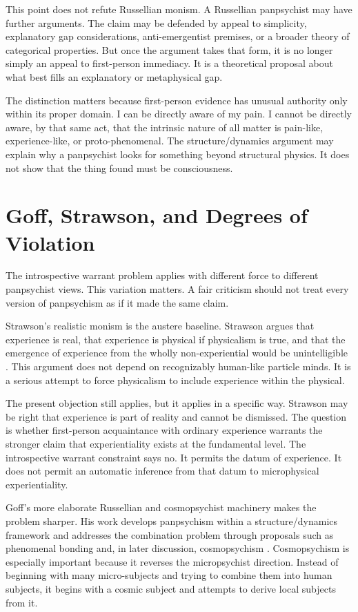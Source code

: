 \documentclass[12pt]{article}
\begin{document}
This point does not refute Russellian monism. A Russellian panpsychist may have further arguments. The claim may be defended by appeal to simplicity, explanatory gap considerations, anti-emergentist premises, or a broader theory of categorical properties. But once the argument takes that form, it is no longer simply an appeal to first-person immediacy. It is a theoretical proposal about what best fills an explanatory or metaphysical gap.

The distinction matters because first-person evidence has unusual authority only within its proper domain. I can be directly aware of my pain. I cannot be directly aware, by that same act, that the intrinsic nature of all matter is pain-like, experience-like, or proto-phenomenal. The structure/dynamics argument may explain why a panpsychist looks for something beyond structural physics. It does not show that the thing found must be consciousness.

\section{Goff, Strawson, and Degrees of Violation}

The introspective warrant problem applies with different force to different panpsychist views. This variation matters. A fair criticism should not treat every version of panpsychism as if it made the same claim.

Strawson's realistic monism is the austere baseline. Strawson argues that experience is real, that experience is physical if physicalism is true, and that the emergence of experience from the wholly non-experiential would be unintelligible \citep{strawson2006}. This argument does not depend on recognizably human-like particle minds. It is a serious attempt to force physicalism to include experience within the physical.

The present objection still applies, but it applies in a specific way. Strawson may be right that experience is part of reality and cannot be dismissed. The question is whether first-person acquaintance with ordinary experience warrants the stronger claim that experientiality exists at the fundamental level. The introspective warrant constraint says no. It permits the datum of experience. It does not permit an automatic inference from that datum to microphysical experientiality.

Goff's more elaborate Russellian and cosmopsychist machinery makes the problem sharper. His work develops panpsychism within a structure/dynamics framework and addresses the combination problem through proposals such as phenomenal bonding and, in later discussion, cosmopsychism \citep{goff2017cfr,goff2017bonding}. Cosmopsychism is especially important because it reverses the micropsychist direction. Instead of beginning with many micro-subjects and trying to combine them into human subjects, it begins with a cosmic subject and attempts to derive local subjects from it.
\end{document}
